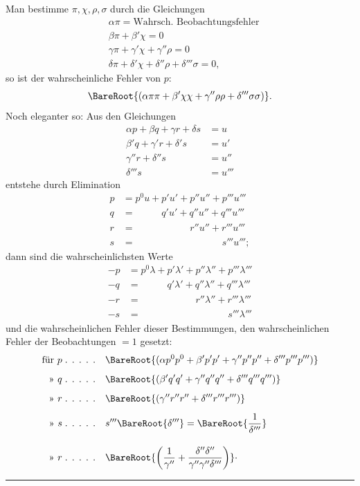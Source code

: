 Man bestimme \(\pi,\chi,\rho,\sigma\) durch die Gleichungen
\[
\begin{aligned}
&\alpha\pi=\text{Wahrsch. Beobachtungsfehler}\\
&\beta\pi+\beta'\chi=0\\
&\gamma\pi+\gamma'\chi+\gamma''\rho=0\\
&\delta\pi+\delta'\chi+\delta''\rho+\delta'''\sigma=0,
\end{aligned}
\]
so ist der wahrscheinliche Fehler von \(p\):
\[
\BareRoot{(\alpha\pi\pi+\beta'\chi\chi+\gamma''\rho\rho+\delta'''\sigma\sigma)}.
\]
Noch eleganter so: Aus den Gleichungen
\[
\begin{aligned}
\alpha p+\beta q+\gamma r+\delta s&=u\\
\beta'q+\gamma'r+\delta's&=u'\\
\gamma''r+\delta''s&=u''\\
\delta'''s&=u'''
\end{aligned}
\]
entstehe durch Elimination
\[
\begin{aligned}
p&=p^0u+p'u'+p''u''+p'''u'''\\
q&=\phantom{p^0u+{}}q'u'+q''u''+q'''u'''\\
r&=\phantom{p^0u+p'u'+{}}r''u''+r'''u'''\\
s&=\phantom{p^0u+p'u'+p''u''+{}}s'''u''';
\end{aligned}
\]
dann sind die wahrscheinlichsten Werte
\[
\begin{aligned}
-p&=p^0\lambda+p'\lambda'+p''\lambda''+p'''\lambda'''\\
-q&=\phantom{p^0\lambda+{}}q'\lambda'+q''\lambda''+q'''\lambda'''\\
-r&=\phantom{p^0\lambda+p'\lambda'+{}}r''\lambda''+r'''\lambda'''\\
-s&=\phantom{p^0\lambda+p'\lambda'+p''\lambda''+{}}s'''\lambda'''
\end{aligned}
\]
und die wahrscheinlichen Fehler dieser Bestimmungen, den wahrscheinlichen Fehler der Beobachtungen \(=1\) gesetzt:
\[
\begin{aligned}
\text{für }p\;\text{. . . . .}\quad&\BareRoot{(\alpha p^0p^0+\beta'p'p'+\gamma''p''p''+\delta'''p'''p''')}\\[5pt]
\text{» }q\;\text{. . . . .}\quad&\BareRoot{(\beta'q'q'+\gamma''q''q''+\delta'''q'''q''')}\\[5pt]
\text{» }r\;\text{. . . . .}\quad&\BareRoot{(\gamma''r''r''+\delta'''r'''r''')}\\[5pt]
\text{» }s\;\text{. . . . .}\quad&s'''\BareRoot{\delta'''}=\BareRoot{\frac{1}{\delta'''}}\\[10pt]
\text{» }r\;\text{. . . . .}\quad&\BareRoot{\left(\frac{1}{\gamma''}+\frac{\delta''\delta''}{\gamma''\gamma''\delta'''}\right)}\mathpunct{\cdot}
\end{aligned}
\]
\begin{center}\rule{.18\textwidth}{.35pt}\end{center}
